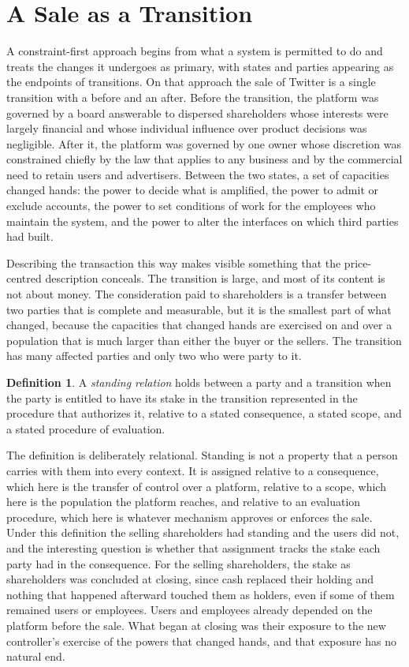 \documentclass[11pt]{article}
\theoremstyle{definition}
\newtheorem{definition}{Definition}
\begin{document}
\section{A Sale as a Transition}

A constraint-first approach begins from what a system is permitted to do and treats the changes it undergoes as primary, with states and parties appearing as the endpoints of transitions. On that approach the sale of Twitter is a single transition with a before and an after. Before the transition, the platform was governed by a board answerable to dispersed shareholders whose interests were largely financial and whose individual influence over product decisions was negligible. After it, the platform was governed by one owner whose discretion was constrained chiefly by the law that applies to any business and by the commercial need to retain users and advertisers. Between the two states, a set of capacities changed hands: the power to decide what is amplified, the power to admit or exclude accounts, the power to set conditions of work for the employees who maintain the system, and the power to alter the interfaces on which third parties had built.

Describing the transaction this way makes visible something that the price-centred description conceals. The transition is large, and most of its content is not about money. The consideration paid to shareholders is a transfer between two parties that is complete and measurable, but it is the smallest part of what changed, because the capacities that changed hands are exercised on and over a population that is much larger than either the buyer or the sellers. The transition has many affected parties and only two who were party to it.

\begin{definition}
A \emph{standing relation} holds between a party and a transition when the party is entitled to have its stake in the transition represented in the procedure that authorizes it, relative to a stated consequence, a stated scope, and a stated procedure of evaluation.
\end{definition}

The definition is deliberately relational. Standing is not a property that a person carries with them into every context. It is assigned relative to a consequence, which here is the transfer of control over a platform, relative to a scope, which here is the population the platform reaches, and relative to an evaluation procedure, which here is whatever mechanism approves or enforces the sale. Under this definition the selling shareholders had standing and the users did not, and the interesting question is whether that assignment tracks the stake each party had in the consequence. For the selling shareholders, the stake as shareholders was concluded at closing, since cash replaced their holding and nothing that happened afterward touched them as holders, even if some of them remained users or employees. Users and employees already depended on the platform before the sale. What began at closing was their exposure to the new controller's exercise of the powers that changed hands, and that exposure has no natural end.
\end{document}
